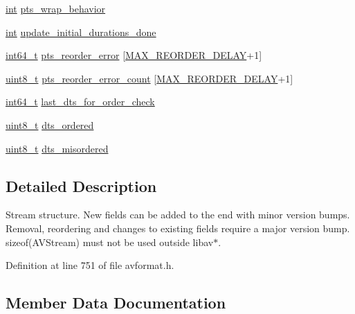 \begin{DoxyCompactItemize}
\item 
\hyperlink{xmltok_8h_a5a0d4a5641ce434f1d23533f2b2e6653}{int} \hyperlink{struct_a_v_stream_aeb3eeb80578432b07b73cb5951c07c5c}{pts\+\_\+wrap\+\_\+behavior}
\item 
\hyperlink{xmltok_8h_a5a0d4a5641ce434f1d23533f2b2e6653}{int} \hyperlink{struct_a_v_stream_a93fae347b93594cbe8ce7d414519b78a}{update\+\_\+initial\+\_\+durations\+\_\+done}
\item 
\hyperlink{lib-src_2ffmpeg_2win32_2stdint_8h_a67a9885ef4908cb72ce26d75b694386c}{int64\+\_\+t} \hyperlink{struct_a_v_stream_ad3e2b5f6e98424f1e5e5bfc909cee38b}{pts\+\_\+reorder\+\_\+error} \mbox{[}\hyperlink{avformat_8h_a1a5362deb573c857ad801ec212ef3583}{M\+A\+X\+\_\+\+R\+E\+O\+R\+D\+E\+R\+\_\+\+D\+E\+L\+AY}+1\mbox{]}
\item 
\hyperlink{lib-src_2ffmpeg_2win32_2stdint_8h_a9a941819355e6f658991890ff66b4b0e}{uint8\+\_\+t} \hyperlink{struct_a_v_stream_acd6fe77bbabf1ad6727492a2749e5275}{pts\+\_\+reorder\+\_\+error\+\_\+count} \mbox{[}\hyperlink{avformat_8h_a1a5362deb573c857ad801ec212ef3583}{M\+A\+X\+\_\+\+R\+E\+O\+R\+D\+E\+R\+\_\+\+D\+E\+L\+AY}+1\mbox{]}
\item 
\hyperlink{lib-src_2ffmpeg_2win32_2stdint_8h_a67a9885ef4908cb72ce26d75b694386c}{int64\+\_\+t} \hyperlink{struct_a_v_stream_ada8c3bd5c2de4c1b5f0895e088167e03}{last\+\_\+dts\+\_\+for\+\_\+order\+\_\+check}
\item 
\hyperlink{lib-src_2ffmpeg_2win32_2stdint_8h_a9a941819355e6f658991890ff66b4b0e}{uint8\+\_\+t} \hyperlink{struct_a_v_stream_a936ec7b1aa699303d20e4489ad4054e3}{dts\+\_\+ordered}
\item 
\hyperlink{lib-src_2ffmpeg_2win32_2stdint_8h_a9a941819355e6f658991890ff66b4b0e}{uint8\+\_\+t} \hyperlink{struct_a_v_stream_a02b107869ea9e14c784d1bfdade3ebf2}{dts\+\_\+misordered}
\end{DoxyCompactItemize}


\subsection{Detailed Description}
Stream structure. New fields can be added to the end with minor version bumps. Removal, reordering and changes to existing fields require a major version bump. sizeof(\+A\+V\+Stream) must not be used outside libav$\ast$. 

Definition at line 751 of file avformat.\+h.



\subsection{Member Data Documentation}
